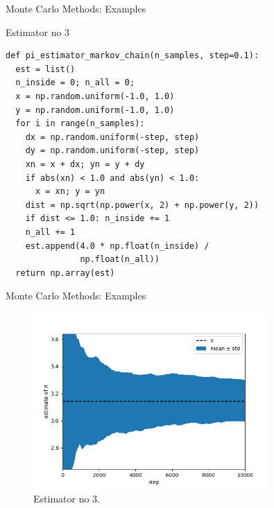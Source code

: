 \documentclass[10pt]{beamer}
\begin{document}
\begin{frame}[fragile]{Monte Carlo Methods: Examples}
\begin{block}{Estimator no 3}
\begin{lstlisting}
def pi_estimator_markov_chain(n_samples, step=0.1):
  est = list()
  n_inside = 0; n_all = 0;
  x = np.random.uniform(-1.0, 1.0)
  y = np.random.uniform(-1.0, 1.0)
  for i in range(n_samples):
    dx = np.random.uniform(-step, step)
    dy = np.random.uniform(-step, step)
    xn = x + dx; yn = y + dy
    if abs(xn) < 1.0 and abs(yn) < 1.0:
      x = xn; y = yn
    dist = np.sqrt(np.power(x, 2) + np.power(y, 2))
    if dist <= 1.0: n_inside += 1
    n_all += 1
    est.append(4.0 * np.float(n_inside) /
               np.float(n_all))
  return np.array(est)
\end{lstlisting}
\end{block}
\end{frame}

\begin{frame}[fragile]{Monte Carlo Methods: Examples}
\begin{figure}
  \includegraphics[width=0.8\textwidth]{code/estimator-3.png}
  \caption{Estimator no 3.}
\end{figure}
\end{frame}
\end{document}
